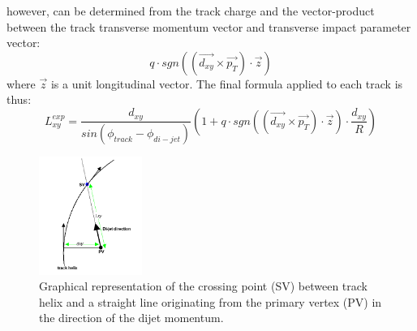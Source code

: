 \begin{enumerate}
however,  can be
determined from the track charge and the vector-product between the track transverse momentum vector and transverse
impact parameter vector:
\begin{equation}
q\cdot sgn((\vec{d_{xy}}\times\vec{p_T}) \cdot \vec{z})
\end{equation}   
where $\vec{z}$ is a unit longitudinal vector. The final formula applied to each track is thus:
\begin{equation}
 L_{xy}^{exp} = \frac{d_{xy}}{sin(\phi_{track} - \phi_{di-jet})} (1 + q\cdot sgn((\vec{d_{xy}}\times\vec{p_T}) \cdot \vec{z}) \cdot \frac{d_{xy}}{R})
\label{eqn:lxy}
\end{equation}


\begin{figure}
\centering
\includegraphics[width=0.3\textwidth]{plots/guessLxy.png}
\caption{Graphical representation of the crossing point (SV) between track helix and a straight line originating from the primary vertex (PV) in the direction of the dijet momentum. \label{fig:guesslxydiagram}}
\end{figure} 


\end{enumerate}
